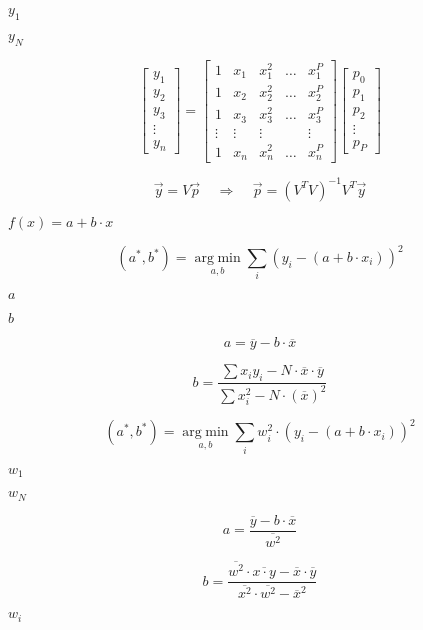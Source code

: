 \documentclass{article}
\begin{document}
$ y_1 $
\pagebreak

$ y_N $
\pagebreak

\[ \begin{bmatrix} y_1\\ y_2\\ y_3 \\ \vdots \\ y_n \end{bmatrix}= \begin{bmatrix} 1 & x_1 & x_1^2 & \dots & x_1^P \\ 1 & x_2 & x_2^2 & \dots & x_2^P\\ 1 & x_3 & x_3^2 & \dots & x_3^P \\ \vdots & \vdots & \vdots & & \vdots \\ 1 & x_n & x_n^2 & \dots & x_n^P \end{bmatrix} \begin{bmatrix} p_0\\ p_1\\ p_2\\ \vdots \\ p_P \end{bmatrix} \]
\pagebreak

\[ \vec{y}=V\vec{p}\ \ \ \ \ \Rightarrow\ \ \ \ \ \vec{p}=(V^TV)^{-1}V^T\vec{y} \]
\pagebreak

$ f(x)=a+b\cdot x $
\pagebreak

\[ (a^\ast, b^\ast)=\mathop{\mathrm{arg\;min}}\limits_{a,b}\sum\limits_i\left(y_i-(a+b\cdot x_i)\right)^2 \]
\pagebreak

$ a $
\pagebreak

$ b $
\pagebreak

\[ a=\overline{y}-b\cdot\overline{x} \]
\pagebreak

\[ b=\frac{\sum x_iy_i-N\cdot\overline{x}\cdot\overline{y}}{\sum x_i^2-N\cdot(\overline{x})^2} \]
\pagebreak

\[ (a^\ast, b^\ast)=\mathop{\mathrm{arg\;min}}\limits_{a,b}\sum\limits_iw_i^2\cdot\left(y_i-(a+b\cdot x_i)\right)^2 \]
\pagebreak

$ w_1 $
\pagebreak

$ w_N $
\pagebreak

\[ a=\frac{\overline{y}-b\cdot\overline{x}}{\overline{w^2}} \]
\pagebreak

\[ b=\frac{\overline{w^2}\cdot\overline{x\cdot y}-\overline{x}\cdot\overline{y}}{\overline{x^2}\cdot\overline{w^2}-\overline{x}^2} \]
\pagebreak

$ w_i$
\pagebreak
\end{document}
